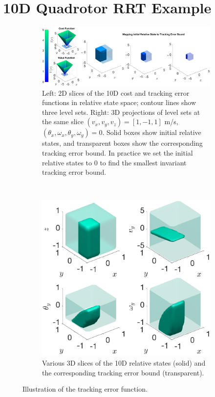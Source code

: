 \section{10D Quadrotor RRT Example \label{sec:results}}
\begin{figure}
  \centering
  \begin{subfigure}{0.65\textwidth}
	  \includegraphics[width=\columnwidth,trim={0 0 0 0},clip]{fig/quad10D_example_cost}
	  \caption{Left: 2D slices of the 10D cost and tracking error functions in relative state space; contour lines show three level sets. Right: 3D projections of level sets at the same slice $(v_{x},v_{y},v_{z})=[1, -1, 1]$ m/s, $(\theta_{x},\omega_{x},\theta_{y},\omega_{y})=0$. Solid boxes show initial relative states, and transparent boxes show the corresponding tracking error bound. In practice we set the initial relative states to 0 to find the smallest invariant tracking error bound.\label{fig:quad10D_example}}
  \end{subfigure}~
  \begin{subfigure}{0.3\textwidth}
    \includegraphics[width=\columnwidth]{fig/quad10D_slices}
    \caption{Various 3D slices of the 10D relative states (solid) and the corresponding tracking error bound (transparent). \label{fig:quad10D_example_slices}}
  \end{subfigure} 
  \caption{Illustration of the tracking error function.}
\end{figure} 

